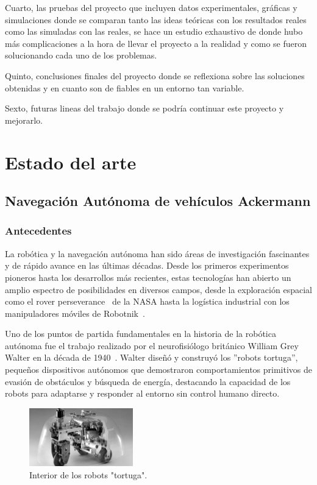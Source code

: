 Cuarto, las pruebas del proyecto que incluyen datos experimentales, gráficas y simulaciones donde se comparan tanto las ideas teóricas con 
los resultados reales como las simuladas con las reales, se hace un estudio exhaustivo de donde hubo más complicaciones a la hora de llevar 
el proyecto a la realidad y como se fueron solucionando cada uno de los problemas.

Quinto, conclusiones finales del proyecto donde se reflexiona sobre las soluciones obtenidas y en cuanto son de fiables en un entorno tan 
variable.

Sexto, futuras lineas del trabajo donde se podría continuar este proyecto y mejorarlo.

\chapter{Estado del arte}
\section{Navegación Autónoma de vehículos Ackermann}
\subsection{Antecedentes}
La robótica y la navegación autónoma han sido áreas de investigación fascinantes y de rápido avance en las últimas décadas. 
Desde los primeros experimentos pioneros hasta los desarrollos más recientes, estas tecnologías han abierto un amplio espectro de 
posibilidades en diversos campos, desde la exploración espacial como el rover perseverance~\Cite{nasa24} de la NASA hasta la logística 
industrial con los manipuladores móviles de Robotnik~\Cite{robotnik24}.

Uno de los puntos de partida fundamentales en la historia de la robótica autónoma fue el trabajo realizado por el neurofisiólogo británico 
William Grey Walter en la década de 1940~\cite{holland2003first}. Walter diseñó y construyó los ''robots tortuga'', pequeños dispositivos 
autónomos que demostraron comportamientos primitivos de evasión de obstáculos y búsqueda de energía, destacando la capacidad de los robots 
para adaptarse y responder al entorno sin control humano directo.

\begin{figure}[h]
    \centering
    \includegraphics[width=0.4\textwidth]{images/tortugas_william_grey.jpg}
    \caption{Interior de los robots "tortuga".}
    \label{fig:tortugas_grey}
\end{figure}


